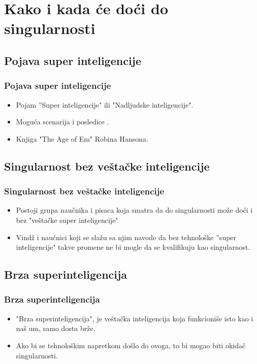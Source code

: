 \documentclass{beamer}
\begin{document}
\section{Kako i kada će doći do singularnosti}
\subsection{Pojava super inteligencije}
\begin{frame}[fragile]\frametitle{Pojava super inteligencije}
	\begin{itemize}	
		\item Pojam ''Super inteligencije" ili "Nadljudske inteligencije".
        \item Moguća scenarija i posledice .
        \item Knjiga "The Age of Em" Robina Hansona.
	\end{itemize}
\end{frame}

\subsection{Singularnost bez veštačke inteligencije}
\begin{frame}[fragile]\frametitle{Singularnost bez veštačke inteligencije}
	\begin{itemize}	
        \item Postoji grupa naučnika i pisaca koja smatra da do singularnosti može doći i bez "veštačke super inteligencije"
        \item Vindž i naučnici koji se slažu sa njim navode da bez tehnološke ''super inteligencije" takve promene ne bi mogle da se kvalifikuju kao singularnost.
	\end{itemize}
\end{frame}

\subsection{Brza superinteligencija}
\begin{frame}[fragile]\frametitle{Brza superinteligencija}
	\begin{itemize}	
        \item "Brza superinteligencija", je veštačka inteligencija koja funkcioniše isto kao i naš um, samo dosta brže.
        \item Ako bi se tehnološkim napretkom došlo do ovoga, to bi mogao biti okidač singularnosti.
	\end{itemize}
\end{frame}
\end{document}
